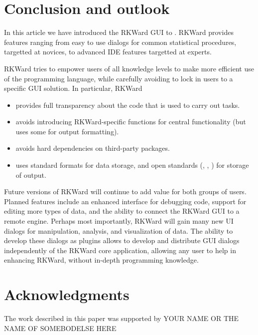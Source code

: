 \section{Conclusion and outlook}
\label{sec:conclusion_summary}
In this article we have introduced the RKWard GUI to . RKWard provides features ranging
from easy to use dialogs for common statistical procedures, targetted at  novices, to advanced
IDE features targetted at  experts.

RKWard tries to empower users of all knowledge levels to make more efficient use of the 
 programming language, while carefully avoiding to lock in users to a specific
GUI solution. In particular, RKWard
\begin{itemize}
 \item provides full transparency about the  code that is used to carry out tasks.
 \item avoids introducing RKWard-specific  functions for central functionality (but uses some for output formatting).
 \item avoids hard dependencies on third-party  packages.
 \item uses standard  formats \citep[cf.][]{RDCT2010c} for data storage, and open standards (, , ) for storage of output.
\end{itemize}


Future versions of RKWard will continue to add value for both groups of users. Planned features include
an enhanced interface for debugging  code, support for editing more types of data, and the
ability to connect the RKWard GUI to a remote  engine. Perhaps most importantly, RKWard will
gain many new UI dialogs for manipulation, analysis, and visualization of data. The ability to
develop these dialogs as plugins allows to develop and distribute GUI dialogs
independently of the RKWard core application, allowing any user to help in enhancing RKWard, without in-depth
programming knowledge.

\section{Acknowledgments}
\label{sec:acknowledgments}
The work described in this paper was supported by YOUR NAME OR THE NAME
OF SOMEBODELSE HERE
